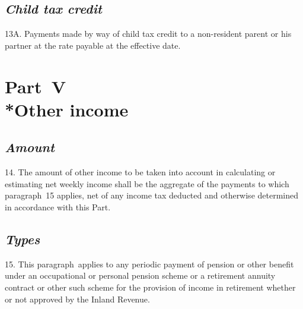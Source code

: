 \documentclass[12pt,a4paper]{article}
\begin{document}
%
%
%

\subsection*{\itshape Child tax credit}

13A.  Payments made by way of child tax credit to a non-resident parent or his partner at the rate payable at the effective date.


\section[Part~V --- Other income]{Part~V\\*Other income}

\renewcommand\parthead{--- Schedule~Part~V}

\subsection*{\itshape Amount}

14.  The amount of other income to be taken into account in calculating or estimating net weekly income shall be the aggregate of the payments to which paragraph~15 applies, net of any income tax deducted and otherwise determined in accordance with this Part.

\subsection*{\itshape Types}

15.  This paragraph~applies to any periodic payment of pension or other benefit under an occupational or personal pension scheme or a retirement annuity contract or other such scheme for the provision of income in retirement whether or not approved by the Inland Revenue.
\end{document}
